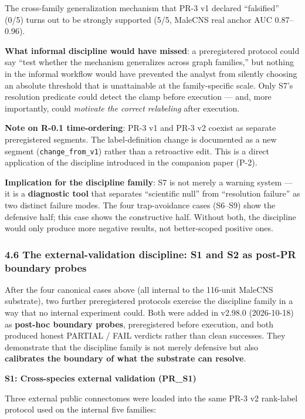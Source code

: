 \documentclass[
]{article}
\begin{document}
The cross-family generalization mechanism that PR-3 v1 declared
``falsified'' (0/5) turns out to be strongly supported (5/5, MaleCNS
real anchor AUC 0.87--0.96).

\textbf{What informal discipline would have missed}: a preregistered
protocol could say ``test whether the mechanism generalizes across graph
families,'' but nothing in the informal workflow would have prevented
the analyst from silently choosing an absolute threshold that is
unattainable at the family-specific scale. Only S7's resolution
predicate could detect the clamp before execution --- and, more
importantly, could \emph{motivate the correct relabeling} after
execution.

\textbf{Note on R-0.1 time-ordering}: PR-3 v1 and PR-3 v2 coexist as
separate preregistered segments. The label-definition change is
documented as a new segment (\texttt{change\_from\_v1}) rather than a
retroactive edit. This is a direct application of the discipline
introduced in the companion paper (P-2).

\textbf{Implication for the discipline family}: S7 is not merely a
warning system --- it is a \textbf{diagnostic tool} that separates
``scientific null'' from ``resolution failure'' as two distinct failure
modes. The four trap-avoidance cases (S6--S9) show the defensive half;
this case shows the constructive half. Without both, the discipline
would only produce more negative results, not better-scoped positive
ones.

\subsubsection{4.6 The external-validation discipline: S1 and S2 as
post-PR boundary
probes}\label{the-external-validation-discipline-s1-and-s2-as-post-pr-boundary-probes}

After the four canonical cases above (all internal to the 116-unit
MaleCNS substrate), two further preregistered protocols exercise the
discipline family in a way that no internal experiment could. Both were
added in v2.98.0 (2026-10-18) as \textbf{post-hoc boundary probes},
preregistered before execution, and both produced honest PARTIAL / FAIL
verdicts rather than clean successes. They demonstrate that the
discipline family is not merely defensive but also \textbf{calibrates
the boundary of what the substrate can resolve}.

\textbf{S1: Cross-species external validation (PR\_S1)}

Three external public connectomes were loaded into the same PR-3 v2
rank-label protocol used on the internal five families:
\end{document}
